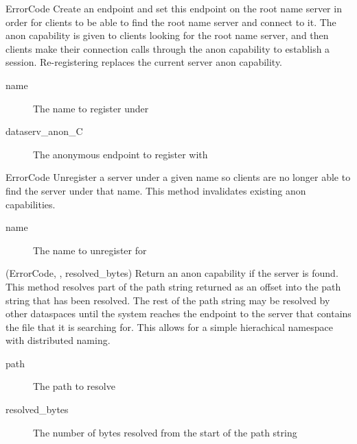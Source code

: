 \begin{description}

    \item {}
        {ErrorCode}
    Create an endpoint and set this endpoint on the root name server in order for clients to be able to find the root name server and connect to it. The anon capability is given to clients looking for the root name server, and then clients make their connection calls through the anon capability to establish a session. Re-registering replaces the current server anon capability.
    \begin{description}
        \item [name] The name to register under
        \item [dataserv\_anon\_C] The anonymous endpoint to register with
    \end{description}

    \item {}
        {ErrorCode}
    Unregister a server under a given name so clients are no longer able to find the server under that name. This method invalidates existing anon capabilities.
    \begin{description}
        \item [name] The name to unregister for
    \end{description}

    \item{}
        {(ErrorCode, , resolved\_bytes)}
    Return an anon capability if the server is found. This method resolves part of the path string returned as an offset into the path string that has been resolved. The rest of the path string may be resolved by other dataspaces until the system reaches the endpoint to the server that contains the file that it is searching for. This allows for a simple hierachical namespace with distributed naming.
    \begin{description}
        \item [path] The path to resolve
        \item [resolved\_bytes] The number of bytes resolved from the start of the path string
    \end{description}

\end{description}


